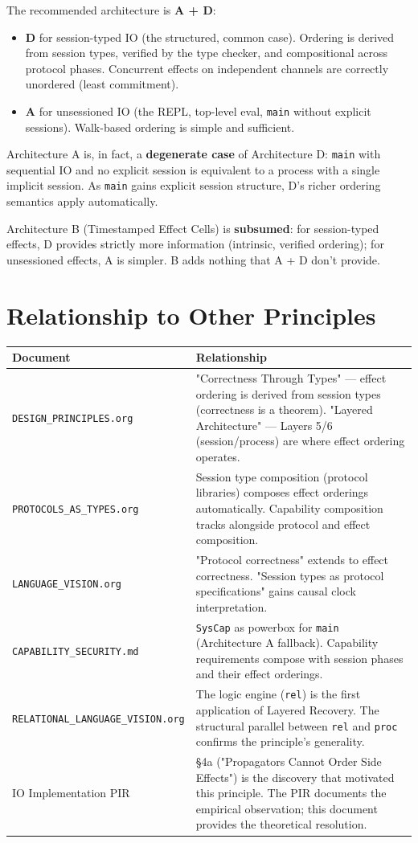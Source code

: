 \documentclass[11pt]{article}
\begin{document}
The recommended architecture is \textbf{A + D}:

\begin{itemize}
\item \textbf{D} for session-typed IO (the structured, common case). Ordering is derived
from session types, verified by the type checker, and compositional across
protocol phases. Concurrent effects on independent channels are correctly
unordered (least commitment).

\item \textbf{A} for unsessioned IO (the REPL, top-level eval, \texttt{main} without explicit
sessions). Walk-based ordering is simple and sufficient.
\end{itemize}

Architecture A is, in fact, a \textbf{degenerate case} of Architecture D: \texttt{main} with
sequential IO and no explicit session is equivalent to a process with a single
implicit session. As \texttt{main} gains explicit session structure, D's richer
ordering semantics apply automatically.

Architecture B (Timestamped Effect Cells) is \textbf{subsumed}: for session-typed
effects, D provides strictly more information (intrinsic, verified ordering);
for unsessioned effects, A is simpler. B adds nothing that A + D don't provide.
\section{Relationship to Other Principles}
\label{sec:org9f2b300}

\begin{center}
\begin{tabular}{ll}
Document & Relationship\\
\hline
\texttt{DESIGN\_PRINCIPLES.org} & "Correctness Through Types" --- effect ordering is derived from session types (correctness is a theorem). "Layered Architecture" --- Layers 5/6 (session/process) are where effect ordering operates.\\
\texttt{PROTOCOLS\_AS\_TYPES.org} & Session type composition (protocol libraries) composes effect orderings automatically. Capability composition tracks alongside protocol and effect composition.\\
\texttt{LANGUAGE\_VISION.org} & "Protocol correctness" extends to effect correctness. "Session types as protocol specifications" gains causal clock interpretation.\\
\texttt{CAPABILITY\_SECURITY.md} & \texttt{SysCap} as powerbox for \texttt{main} (Architecture A fallback). Capability requirements compose with session phases and their effect orderings.\\
\texttt{RELATIONAL\_LANGUAGE\_VISION.org} & The logic engine (\texttt{rel}) is the first application of Layered Recovery. The structural parallel between \texttt{rel} and \texttt{proc} confirms the principle's generality.\\
IO Implementation PIR & §4a ("Propagators Cannot Order Side Effects") is the discovery that motivated this principle. The PIR documents the empirical observation; this document provides the theoretical resolution.\\
\end{tabular}
\end{center}
\end{document}
